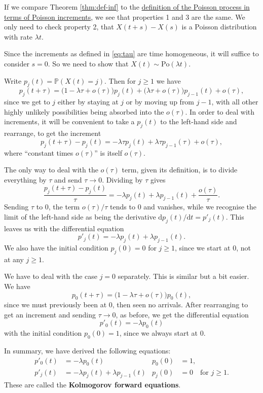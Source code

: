 \documentclass[
  a4paper,
]{article}
\theoremstyle{definition}
\theoremstyle{definition}
\theoremstyle{definition}
\theoremstyle{remark}
\begin{document}
If we compare Theorem \ref{thm:def-inf} to the \protect\hyperlink{thm:ux5cux23poisson-def-1}{definition of the Poisson process in terms of Poisson increments}, we see that properties 1 and 3 are the same. We only need to check property 2, that \(X(t+s) - X(s)\) is a Poisson distribution with rate \(\lambda t\).

Since the increments as defined in \eqref{eq:tau} are time homogeneous, it will suffice to consider \(s = 0\). So we need to show that \(X(t) \sim \text{Po}(\lambda t)\).

Write \(p_j(t) = \mathbb P(X(t) = j)\). Then for \(j \geq 1\) we have
\[ p_j(t + \tau) = \big(1 - \lambda\tau + o(\tau)\big)p_j(t) + \big(\lambda\tau + o(\tau)\big) p_{j-1}(t) + o(\tau) , \]
since we get to \(j\) either by staying at \(j\) or by moving up from \(j-1\), with all other highly unlikely possibilities being absorbed into the \(o(\tau)\). In order to deal with increments, it will be convenient to take a \(p_{j}(t)\) to the left-hand side and rearrange, to get the increment
\[ p_j(t + \tau) - p_j(t) = -\lambda\tau p_j(t) + \lambda\tau p_{j-1}(\tau) + o(\tau) , \]
where ``constant times \(o(\tau)\)'' is itself \(o(\tau)\).

The only way to deal with the \(o(\tau)\) term, given its definition, is to divide everything by \(\tau\) and send \(\tau \to 0\). Dividing by \(\tau\) gives
\[ \frac{p_j(t + \tau) - p_j(t)}{\tau} = -\lambda p_j(t) + \lambda p_{j-1}(t) + \frac{o(\tau)}{\tau} . \]
Sending \(\tau\) to 0, the term \(o(\tau)/\tau\) tends to 0 and vanishes, while we recognise the limit of the left-hand side as being the derivative \(\mathrm d p_j(t) / \mathrm d t = p'_j(t)\).
This leaves us with the differential equation
\[ p'_j(t) = -\lambda p_j(t) + \lambda p_{j-1}(t) . \]
We also have the initial condition \(p_j(0) = 0\) for \(j \geq 1\), since we start at 0, not at any \(j \geq 1\).

We have to deal with the case \(j = 0\) separately. This is similar but a bit easier. We have
\[ p_0(t + \tau) = \big(1 - \lambda\tau + o(\tau)\big)p_0(t) , \]
since we must previously been at 0, then seen no arrivals.
After rearranging to get an increment and sending \(\tau \to 0\), as before, we get the differential equation
\[ p'_0(t) = -\lambda p_0(t) \]
with the initial condition \(p_0(0) = 1\), since we always start at 0.

In summary, we have derived the following equations:
\begin{align*}
   p'_0(t) &= -\lambda p_0(t) & p_0(0) & = 1 ,\\
   p'_j(t) &= -\lambda p_j(t) + \lambda p_{j-1}(t) &  p_j(0) &= 0 \quad \text{for $j \geq 1$} .
\end{align*}
These are called the \textbf{Kolmogorov forward equations}.
\end{document}
